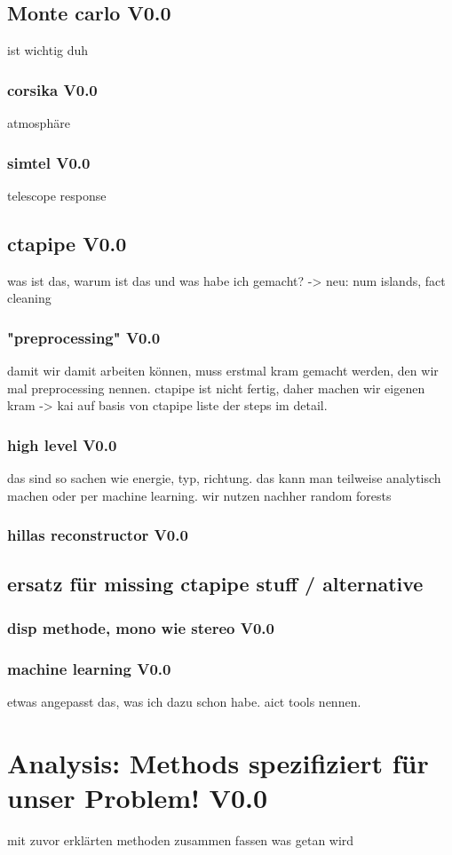 \section{Monte carlo V0.0}
ist wichtig duh
\subsection{corsika V0.0}
atmosphäre
\subsection{simtel V0.0}
telescope response
\section{ctapipe V0.0}
was ist das, warum ist das und was habe ich gemacht?
-> neu: num islands, fact cleaning
\subsection{"preprocessing" V0.0}
damit wir damit arbeiten können, muss erstmal kram gemacht werden, den
wir mal preprocessing nennen.
ctapipe ist nicht fertig, daher machen wir eigenen kram -> kai auf basis von ctapipe
liste der steps im detail.
\subsection{high level V0.0}
das sind so sachen wie energie, typ, richtung.
das kann man teilweise analytisch machen oder
per machine learning. wir nutzen nachher random forests 
\subsection{hillas reconstructor V0.0}
\section{ersatz für missing ctapipe stuff / alternative}
\subsection{disp methode, mono wie stereo V0.0}
\subsection{machine learning V0.0}
etwas angepasst das, was ich dazu schon habe.
aict tools nennen.


\chapter{Analysis: Methods spezifiziert für unser Problem! V0.0}
mit zuvor erklärten methoden zusammen fassen was getan wird
